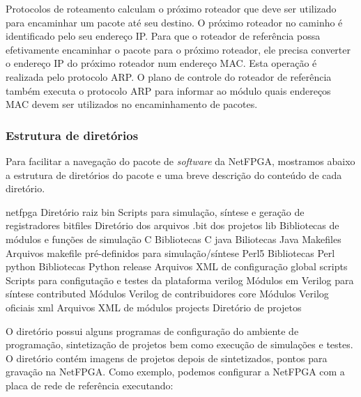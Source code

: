 
Protocolos de roteamento calculam o próximo roteador que deve ser
utilizado para encaminhar um pacote até seu destino.  O próximo roteador
no caminho é identificado pelo seu endereço IP.  Para que o roteador de
referência possa efetivamente encaminhar o pacote para o próximo
roteador, ele precisa converter o endereço IP do próximo roteador num
endereço MAC.  Esta operação é realizada pelo protocolo ARP.  O plano de
controle do roteador de referência também executa o protocolo ARP para
informar ao módulo  quais endereços MAC devem
ser utilizados no encaminhamento de pacotes.

\subsubsection{Estrutura de diretórios}

Para facilitar a navegação do pacote de \emph{software} da NetFPGA,
mostramos abaixo a estrutura de diretórios do pacote e uma breve
descrição do conteúdo de cada diretório.

\begin{verbnobox}[\footnotesize]
netfpga                {Diretório raiz}
   bin                 {Scripts para simulação, síntese e geração de registradores}
   bitfiles            {Diretório dos arquivos .bit dos projetos}
   lib                 {Bibliotecas de módulos e funções de simulação}
      C                {Bibliotecas C}
      java             {Biliotecas Java}
      Makefiles        {Arquivos makefile pré-definidos para simulação/síntese}
      Perl5            {Bibliotecas Perl}
      python           {Bibliotecas Python}
      release          {Arquivos XML de configuração global}
      scripts          {Scripts para configutação e testes da plataforma}
      verilog          {Módulos em Verilog para síntese}
         contributed   {Módulos Verilog de contribuidores}
         core          {Módulos Verilog oficiais}
      xml              {Arquivos XML de módulos}
   projects            {Diretório de projetos}
\end{verbnobox}

O diretório  possui alguns programas de configuração do
ambiente de programação, sintetização de projetos bem como execução de
simulações e testes.  O diretório  contém imagens de
projetos depois de sintetizados, pontos para gravação na NetFPGA.  Como
exemplo, podemos configurar a NetFPGA com a placa de rede de referência
executando:


